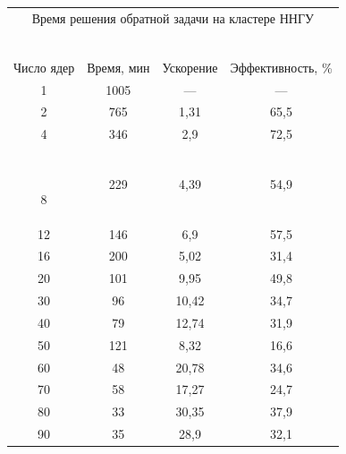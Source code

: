   \begin{table}\small


  \begin{center}


  


  \begin{tabular}{|c|c|c|c|}


  \multicolumn{4}{c}{Время решения обратной задачи на кластере ННГУ}\\


   \multicolumn{4}{c}{\ }\\[-6pt]


   \hline


   &&&\\[-9pt]


Число ядер& Время, мин &Ускорение &Эффективность, \% \\


\hline


\hphantom{9}1& 1005\hphantom{9} & --- & --- \\


\hphantom{9}2& 765&  1,31& 65,5 \\


\hphantom{9}4& 346& 2,9\hphantom{9}& 72,5\\\


\hphantom{9}8& 229& 4,39& 54,9\\


12& 146 & 6,9\hphantom{9}& 57,5\\


16& 200 & 5,02& 31,4\\


20& 101& 9,95& 49,8\\


30& \hphantom{9}96& 10,42\hphantom{9}& 34,7\\


40& \hphantom{9}79& 12,74\hphantom{9}& 31,9\\


50& 121& 8,32& 16,6\\


60& \hphantom{9}48& 20,78\hphantom{9}& 34,6\\


70& \hphantom{9}58& 17,27\hphantom{9}& 24,7\\


80& \hphantom{9}33& 30,35\hphantom{9}& 37,9\\


90& \hphantom{9}35& 28,9\hphantom{99}& 32,1\\


  \hline


    \end{tabular}


    \end{center}


    \vspace*{-6pt}


    \end{table}



